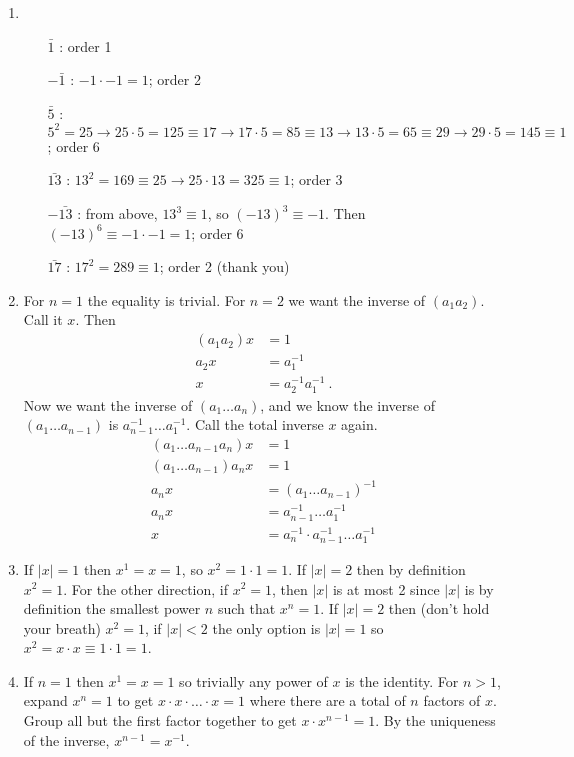 \documentclass[]{article}
\newcommand{\abs}[1]{\left\vert #1 \right\vert}
\begin{document}
\begin{enumerate}
\item \begin{enumerate}
\item[$\bar{1}$]: order 1
\item[$-\bar{1}$]: $-1\cdot -1 = 1$; order 2
\item[$\bar{5}$]: $5^2 = 25 \rightarrow 25\cdot 5 = 125 \equiv 17 \rightarrow 17\cdot 5 = 85 \equiv 13 \rightarrow 13\cdot 5 = 65 \equiv 29 \rightarrow 29\cdot 5 = 145 \equiv 1$; order 6
\item[$\bar{13}$]: $13^2 = 169 \equiv 25 \rightarrow 25\cdot 13 = 325 \equiv 1$; order 3
\item[$-\bar{13}$]: from above, $13^3 \equiv 1$, so $(-13)^3 \equiv -1$. Then $(-13)^6 \equiv -1\cdot -1 = 1$; order 6
\item[$\bar{17}$]: $17^2 = 289 \equiv 1$; order 2 (thank you)
\end{enumerate}


\item For $n=1$ the equality is trivial. For $n=2$ we want the inverse of $(a_1a_2)$. Call it $x$. Then
\begin{align}
(a_1a_2)x &= 1 \\
a_2 x &= a_1^{-1} \\
x &= a_2^{-1} a_1^{-1}\ .
\end{align}
Now we want the inverse of $(a_1\ldots a_n)$, and we know the inverse of $(a_1\ldots a_{n-1})$ is $a_{n-1}^{-1}\ldots a_1^{-1}$. Call the total inverse $x$ again.
\begin{align}
(a_1\ldots a_{n-1}a_n)x &= 1 \\
(a_1\ldots a_{n-1})a_nx &= 1 \\
a_nx &= (a_1\ldots a_{n-1})^{-1} \\
a_nx &= a_{n-1}^{-1}\ldots a_1^{-1} \\
x &= a_n^{-1}\cdot a_{n-1}^{-1}\ldots a_1^{-1}
\end{align}


\item If $\abs{x} = 1$ then $x^1 = x = 1$, so $x^2 = 1\cdot 1 = 1$. If $\abs{x} = 2$ then by definition $x^2 = 1$. For the other direction, if $x^2=1$, then $\abs{x}$ is at most 2 since $\abs{x}$ is by definition the smallest power $n$ such that $x^n=1$. If $\abs{x} = 2$ then (don't hold your breath) $x^2 = 1$, if $\abs{x}<2$ the only option is $\abs{x} = 1$ so $x^2 = x\cdot x \equiv 1\cdot 1 = 1$.


\item If $n=1$ then $x^1 = x = 1$ so trivially any power of $x$ is the identity. For $n>1$, expand $x^n = 1$ to get $x \cdot x \cdot \ldots \cdot x = 1$ where there are a total of $n$ factors of $x$. Group all but the first factor together to get $x \cdot x^{n-1} = 1$. By the uniqueness of the inverse, $x^{n-1} = x^{-1}$.



\end{enumerate}
\end{document}
